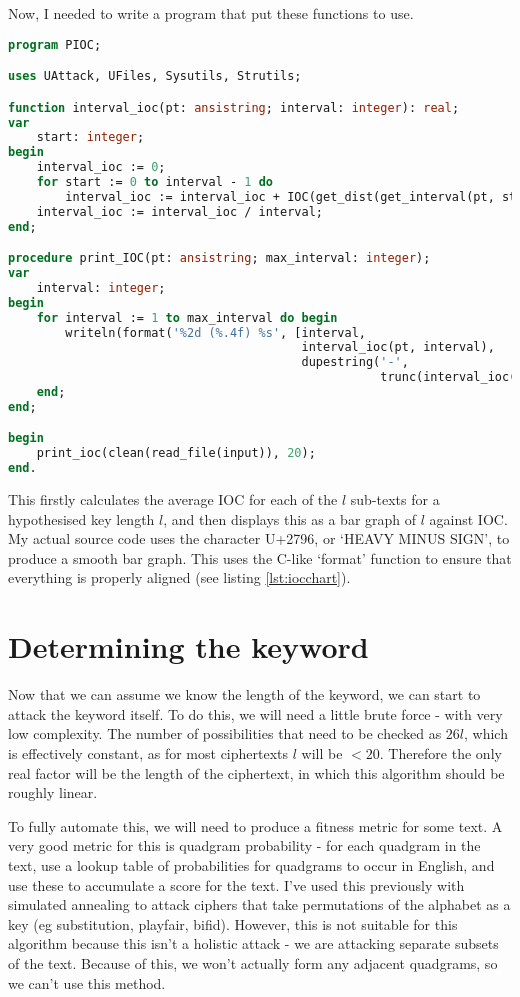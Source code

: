\documentclass{article}
\begin{document}
    Now, I needed to write a program that put these functions to use.

\begin{lstlisting}[language=Pascal, caption=Command-line interface to IOC functions (PIOC.pas)]
program PIOC;

uses UAttack, UFiles, Sysutils, Strutils;

function interval_ioc(pt: ansistring; interval: integer): real;
var
    start: integer;
begin
    interval_ioc := 0;
    for start := 0 to interval - 1 do
        interval_ioc := interval_ioc + IOC(get_dist(get_interval(pt, start, interval)));
    interval_ioc := interval_ioc / interval;
end;

procedure print_IOC(pt: ansistring; max_interval: integer);
var
    interval: integer;
begin
    for interval := 1 to max_interval do begin
        writeln(format('%2d (%.4f) %s', [interval,
                                         interval_ioc(pt, interval),
                                         dupestring('-',
                                                    trunc(interval_ioc(pt, interval) * 500))]));
    end;
end;

begin
    print_ioc(clean(read_file(input)), 20);
end.
\end{lstlisting}

    This firstly calculates the average IOC for each of the $l$ sub-texts for a
    hypothesised key length $l$, and then displays this as a bar graph of $l$
    against IOC. My actual source code uses the character U+2796, or `HEAVY
    MINUS SIGN', to produce a smooth bar graph. This uses the C-like `format'
    function to ensure that everything is properly aligned (see listing
    \ref{lst:iocchart}).

    \section{Determining the keyword}

    Now that we can assume we know the length of the keyword, we can start to
    attack the keyword itself. To do this, we will need a little brute force -
    with very low complexity. The number of possibilities that need to be
    checked as $26l$, which is effectively constant, as for most ciphertexts
    $l$ will be $< 20$. Therefore the only real factor will be the length of
    the ciphertext, in which this algorithm should be roughly linear.

    To fully automate this, we will need to produce a fitness metric for some
    text. A very good metric for this is quadgram probability - for each
    quadgram in the text, use a lookup table of probabilities for quadgrams to
    occur in English, and use these to accumulate a score for the text. I've
    used this previously with simulated annealing to attack ciphers that take
    permutations of the alphabet as a key (eg substitution, playfair, bifid).
    However, this is not suitable for this algorithm because this isn't a
    holistic attack - we are attacking separate subsets of the text. Because of
    this, we won't actually form any adjacent quadgrams, so we can't use this
    method.
\end{document}
